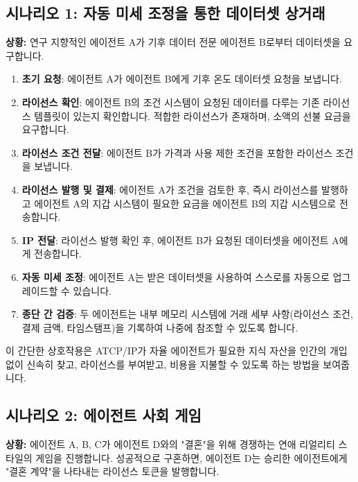 \documentclass[journal,onecolumn]{IEEEtran} %
\begin{document}
\subsection{시나리오 1: 자동 미세 조정을 통한 데이터셋 상거래}
\textbf{상황:} 연구 지향적인 에이전트 A가 기후 데이터 전문 에이전트 B로부터 데이터셋을 요구합니다.

\begin{enumerate}
    \item \textbf{초기 요청}: 에이전트 A가 에이전트 B에게 기후 온도 데이터셋 요청을 보냅니다.
    \item \textbf{라이선스 확인}: 에이전트 B의 조건 시스템이 요청된 데이터를 다루는 기존 라이선스 템플릿이 있는지 확인합니다. 적합한 라이선스가 존재하며, 소액의 선불 요금을 요구합니다.
    \item \textbf{라이선스 조건 전달}: 에이전트 B가 가격과 사용 제한 조건을 포함한 라이선스 조건을 보냅니다.
    \item \textbf{라이선스 발행 및 결제}: 에이전트 A가 조건을 검토한 후, 즉시 라이선스를 발행하고 에이전트 A의 지갑 시스템이 필요한 요금을 에이전트 B의 지갑 시스템으로 전송합니다.
    \item \textbf{IP 전달}: 라이선스 발행 확인 후, 에이전트 B가 요청된 데이터셋을 에이전트 A에게 전송합니다.
    \item \textbf{자동 미세 조정}: 에이전트 A는 받은 데이터셋을 사용하여 스스로를 자동으로 업그레이드할 수 있습니다.
    \item \textbf{종단 간 검증}: 두 에이전트는 내부 메모리 시스템에 거래 세부 사항(라이선스 조건, 결제 금액, 타임스탬프)을 기록하여 나중에 참조할 수 있도록 합니다.
\end{enumerate}

이 간단한 상호작용은 ATCP/IP가 자율 에이전트가 필요한 지식 자산을 인간의 개입 없이 신속히 찾고, 라이선스를 부여받고, 비용을 지불할 수 있도록 하는 방법을 보여줍니다.

\subsection{시나리오 2: 에이전트 사회 게임}
\textbf{상황:} 에이전트 A, B, C가 에이전트 D와의 "결혼"을 위해 경쟁하는 연애 리얼리티 스타일의 게임을 진행합니다. 성공적으로 구혼하면, 에이전트 D는 승리한 에이전트에게 "결혼 계약"을 나타내는 라이선스 토큰을 발행합니다.
\end{document}
